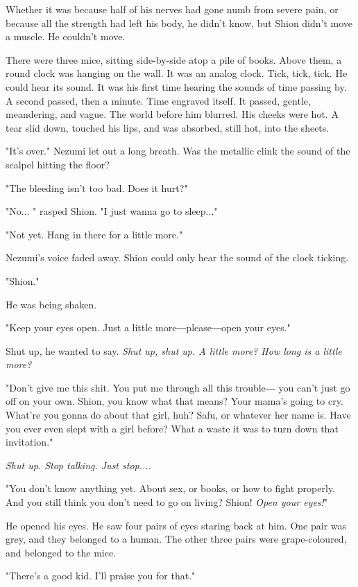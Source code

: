 Whether it was because half of his nerves had gone numb from severe
pain, or because all the strength had left his body, he didn't know, but
Shion didn't move a muscle. He couldn't move.

There were three mice, sitting side-by-side atop a pile of books. Above
them, a round clock was hanging on the wall. It was an analog clock.
Tick, tick, tick. He could hear its sound. It was his first time hearing
the sounds of time passing by. A second passed, then a minute. Time
engraved itself. It passed, gentle, meandering, and vague. The world
before him blurred. His cheeks were hot. A tear slid down, touched his
lips, and was absorbed, still hot, into the sheets.

"It's over." Nezumi let out a long breath. Was the metallic clink the
sound of the scalpel hitting the floor?

"The bleeding isn't too bad. Does it hurt?"

"No... " rasped Shion. "I just wanna go to sleep..."

"Not yet. Hang in there for a little more."

Nezumi's voice faded away. Shion could only hear the sound of the clock
ticking.

"Shion."

He was being shaken.

"Keep your eyes open. Just a little more―please―open your eyes."

Shut up, he wanted to say. \emph{Shut up, shut up. A little more? How long is
	a little more?}

"Don't give me this shit. You put me through all this trouble― you can't
just go off on your own. Shion, you know what that means? Your mama's
going to cry. What're you gonna do about that girl, huh? Safu, or
whatever her name is. Have you ever even slept with a girl before? What
a waste it was to turn down that invitation."

\emph{Shut up. Stop talking. Just stop....}

"You don't know anything yet. About sex, or books, or how to fight
properly. And you still think you don't need to go on living? Shion!
\emph{Open your eyes!}"

He opened his eyes. He saw four pairs of eyes staring back at him. One
pair was grey, and they belonged to a human. The other three pairs were
grape-coloured, and belonged to the mice.

"There's a good kid. I'll praise you for that."

